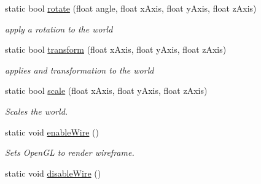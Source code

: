 \begin{DoxyCompactItemize}
static bool \hyperlink{class_o_p_e_n_g_l___facade_ae8927d95a970d8805682f938045e358b}{rotate} (float angle, float x\-Axis, float y\-Axis, float z\-Axis)
\begin{DoxyCompactList}\small\item\em apply a rotation to the world \end{DoxyCompactList}\item 
static bool \hyperlink{class_o_p_e_n_g_l___facade_ac578782f1a87df1afdca235bbc9a16ef}{transform} (float x\-Axis, float y\-Axis, float z\-Axis)
\begin{DoxyCompactList}\small\item\em applies and transformation to the world \end{DoxyCompactList}\item 
static bool \hyperlink{class_o_p_e_n_g_l___facade_aa3b8aea00b9d19d663c2a2b3d6e3abc0}{scale} (float x\-Axis, float y\-Axis, float z\-Axis)
\begin{DoxyCompactList}\small\item\em Scales the world. \end{DoxyCompactList}\item 
\hypertarget{class_o_p_e_n_g_l___facade_a965eaee1c3d8b0de6077adc1ac8af473}{static void \hyperlink{class_o_p_e_n_g_l___facade_a965eaee1c3d8b0de6077adc1ac8af473}{enable\-Wire} ()}\label{class_o_p_e_n_g_l___facade_a965eaee1c3d8b0de6077adc1ac8af473}

\begin{DoxyCompactList}\small\item\em Sets Open\-G\-L to render wireframe. \end{DoxyCompactList}\item 
\hypertarget{class_o_p_e_n_g_l___facade_a76d541372d8b7fc3e1d66c07adfd13d6}{static void \hyperlink{class_o_p_e_n_g_l___facade_a76d541372d8b7fc3e1d66c07adfd13d6}{disable\-Wire} ()}\label{class_o_p_e_n_g_l___facade_a76d541372d8b7fc3e1d66c07adfd13d6}


\end{DoxyCompactItemize}
